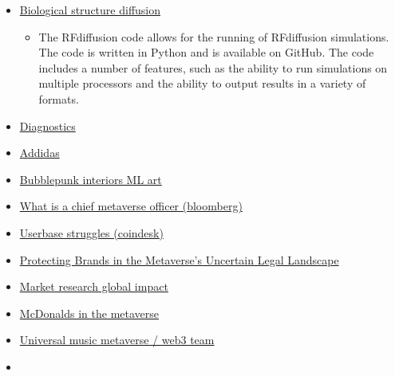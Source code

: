 \begin{itemize}
  \begin{itemize}
   
  \item
  \end{itemize}
\item
  \href{https://github.com/RosettaCommons/RFdiffusion}{Biological
  structure diffusion}

  \begin{itemize}
   
  \item
    The RFdiffusion code allows for the running of RFdiffusion
    simulations. The code is written in Python and is available on
    GitHub. The code includes a number of features, such as the ability
    to run simulations on multiple processors and the ability to output
    results in a variety of formats.
  \end{itemize}
\item
  \href{https://www.amazon.co.uk/AI-Revolution-Medicine-GPT-4-Beyond/dp/0138200130}{Diagnostics}
\item
  \href{https://www.adidas.com/into_the_metaverse/mint}{Addidas}
\item
  \href{https://www.bubblepunk.io/bubblepunk-interiors}{Bubblepunk
  interiors ML art}
\item
  \href{https://www.bloomberg.com/news/articles/2022-09-22/what-is-a-chief-metaverse-officer-and-do-you-need-one}{What
  is a chief metaverse officer (bloomberg)}
\item
  \href{https://www.coindesk.com/markets/2022/04/06/metaverse-majors-struggle-as-user-base-falls-short-of-market-expectations/?outputType=amp}{Userbase
  struggles (coindesk)}
\item
  \href{https://wwd.com/business-news/technology/metaverse-lawsuit-nike-stockx-hermes-metabirken-fashion-1235247763/}{Protecting
  Brands in the Metaverse's Uncertain Legal Landscape}
\item
  \href{https://www.analysisgroup.com/globalassets/insights/publishing/2022-the-potential-global-economic-impact-of-the-metaverse.pdf}{Market
  research global impact}
\item
  \href{https://www.businessinsider.com/mcdonalds-metaverse-virtual-online-restaurant-trademark-delivers-food-web3-nft-2022-2}{McDonalds
  in the metaverse}
\item
  \href{https://www.musicweek.com/labels/read/universal-music-group-s-digital-strategy-team-creates-key-roles-for-web3-and-the-metaverse/087103}{Universal
  music metaverse / web3 team}
\item

\end{itemize}
